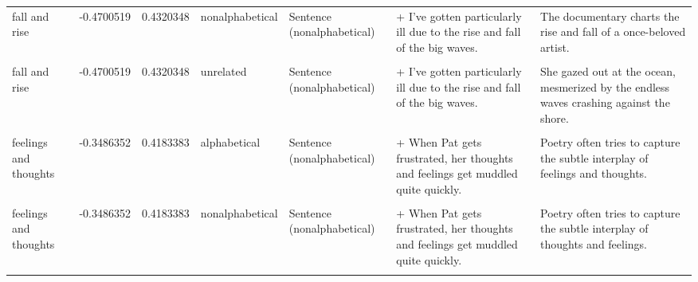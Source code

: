 \documentclass[
  12pt,
]{scrartcl}
\begin{document}
\begin{landscape}
\begin{longtable}{lrrllll}
\addlinespace
fall and rise & -0.4700519 & 0.4320348 & nonalphabetical & Sentence (nonalphabetical) & + I've gotten particularly ill due to the rise and fall of the big waves. & The documentary charts the rise and fall of a once-beloved artist.\\
\cellcolor{gray!6}{fall and rise} & \cellcolor{gray!6}{-0.4700519} & \cellcolor{gray!6}{0.4320348} & \cellcolor{gray!6}{unrelated} & \cellcolor{gray!6}{Sentence (alphabetical)} & \cellcolor{gray!6}{+ I've gotten particularly ill due to the fall and rise of the big waves.} & \cellcolor{gray!6}{She gazed out at the ocean, mesmerized by the endless waves crashing against the shore.}\\
fall and rise & -0.4700519 & 0.4320348 & unrelated & Sentence (nonalphabetical) & + I've gotten particularly ill due to the rise and fall of the big waves. & She gazed out at the ocean, mesmerized by the endless waves crashing against the shore.\\
\cellcolor{gray!6}{feelings and thoughts} & \cellcolor{gray!6}{-0.3486352} & \cellcolor{gray!6}{0.4183383} & \cellcolor{gray!6}{alphabetical} & \cellcolor{gray!6}{Sentence (alphabetical)} & \cellcolor{gray!6}{+ When Pat gets frustrated, her feelings and thoughts get muddled quite quickly.} & \cellcolor{gray!6}{Poetry often tries to capture the subtle interplay of feelings and thoughts.}\\
feelings and thoughts & -0.3486352 & 0.4183383 & alphabetical & Sentence (nonalphabetical) & + When Pat gets frustrated, her thoughts and feelings get muddled quite quickly. & Poetry often tries to capture the subtle interplay of feelings and thoughts.\\
\addlinespace
\cellcolor{gray!6}{feelings and thoughts} & \cellcolor{gray!6}{-0.3486352} & \cellcolor{gray!6}{0.4183383} & \cellcolor{gray!6}{nonalphabetical} & \cellcolor{gray!6}{Sentence (alphabetical)} & \cellcolor{gray!6}{+ When Pat gets frustrated, her feelings and thoughts get muddled quite quickly.} & \cellcolor{gray!6}{Poetry often tries to capture the subtle interplay of thoughts and feelings.}\\
feelings and thoughts & -0.3486352 & 0.4183383 & nonalphabetical & Sentence (nonalphabetical) & + When Pat gets frustrated, her thoughts and feelings get muddled quite quickly. & Poetry often tries to capture the subtle interplay of thoughts and feelings.\\
\cellcolor{gray!6}{feelings and thoughts} & \cellcolor{gray!6}{-0.3486352} & \cellcolor{gray!6}{0.4183383} & \cellcolor{gray!6}{unrelated} & \cellcolor{gray!6}{Sentence (alphabetical)} & \cellcolor{gray!6}{+ When Pat gets frustrated, her feelings and thoughts get muddled quite quickly.} & \cellcolor{gray!6}{He flipped through the album, each photograph bringing back a flood of memories.}\\

\end{longtable}
\end{landscape}
\end{document}
